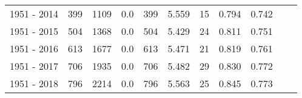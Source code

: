 \begin{tabular}{gcgcgcgcgcg}
1951 - 2014 &      399 &     1109 &    0.0 &   399 &       5.559 &             15 &       0.794 &             0.742 \\
1951 - 2015 &      504 &     1368 &    0.0 &   504 &       5.429 &             24 &       0.811 &             0.751 \\
1951 - 2016 &      613 &     1677 &    0.0 &   613 &       5.471 &             21 &       0.819 &             0.761 \\
1951 - 2017 &      706 &     1935 &    0.0 &   706 &       5.482 &             29 &       0.830 &             0.772 \\
1951 - 2018 &      796 &     2214 &    0.0 &   796 &       5.563 &             25 &       0.845 &             0.773 \\
\bottomrule
\end{tabular}
